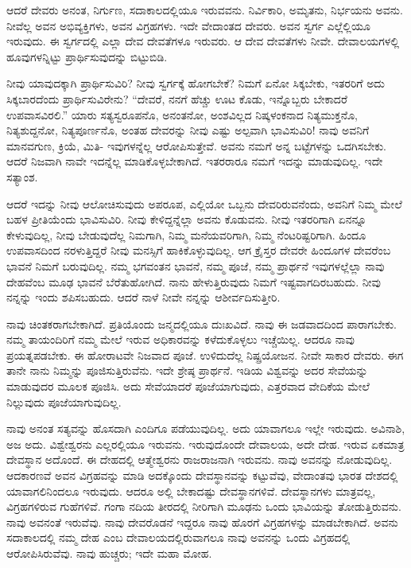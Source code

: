 ಆದರೆ ದೇವರು ಅನಂತ, ನಿರ್ಗುಣ, ಸದಾಕಾಲದಲ್ಲಿಯೂ ಇರುವವನು. ನಿರ್ವಿಕಾರಿ, ಅಮೃತನು, ನಿರ್ಭಯನು ಅವನು. ನೀವೆಲ್ಲ ಅವನ ಅಭಿವ್ಯಕ್ತಿಗಳು, ಅವನ ವಿಗ್ರಹಗಳು. ಇದೇ ವೇದಾಂತದ ದೇವರು. ಅವನ ಸ್ವರ್ಗ ಎಲ್ಲೆಲ್ಲಿಯೂ ಇರುವುದು. ಈ ಸ್ವರ್ಗದಲ್ಲಿ ಎಲ್ಲಾ ದೇವ ದೇವತೆಗಳೂ ಇರುವರು. ಆ ದೇವ ದೇವತೆಗಳು ನೀವೇ. ದೇವಾಲಯಗಳಲ್ಲಿ ಹೂವುಗಳನ್ನಿಟ್ಟು ಪ್ರಾರ್ಥಿಸುವುದನ್ನು ಬಿಟ್ಟುಬಿಡಿ.

ನೀವು ಯಾವುದಕ್ಕಾಗಿ ಪ್ರಾರ್ಥಿಸುವಿರಿ? ನೀವು ಸ್ವರ್ಗಕ್ಕೆ ಹೋಗಬೇಕೆ? ನಿಮಗೆ ಏನೋ ಸಿಕ್ಕಬೇಕು, ಇತರರಿಗೆ ಅದು ಸಿಕ್ಕಬಾರದೆಂದು ಪ್ರಾರ್ಥಿಸುವಿರೇನು? “ದೇವರೆ, ನನಗೆ ಹೆಚ್ಚು ಊಟ ಕೊಡು, ಇನ್ನೊಬ್ಬರು ಬೇಕಾದರೆ ಉಪವಾಸವಿರಲಿ.'' ಯಾರು ಸತ್ಯಸ್ವರೂಪನೊ, ಅನಂತನೋ, ಅಂಶವಿಲ್ಲದ ನಿಷ್ಕಳಂಕನಾದ ನಿತ್ಯಮುಕ್ತನೊ, ನಿತ್ಯಶುದ್ದನೋ, ನಿತ್ಯಪೂರ್ಣನೊ, ಅಂತಹ ದೇವರನ್ನು ನೀವು ಎಷ್ಟು ಅಲ್ಪವಾಗಿ ಭಾವಿಸುವಿರಿ! ನಾವು ಅವನಿಗೆ ಮಾನವಗುಣ, ಕ್ರಿಯೆ, ಮಿತಿ- ಇವುಗಳನ್ನೆಲ್ಲ ಆರೋಪಿಸುತ್ತೇವೆ. ಅವನು ನಮಗೆ ಅನ್ನ ಬಟ್ಟೆಗಳನ್ನು ಒದಗಿಸಬೇಕು. ಆದರೆ ನಿಜವಾಗಿ ನಾವೇ ಇದನ್ನೆಲ್ಲ ಮಾಡಿಕೊಳ್ಳಬೇಕಾಗಿದೆ. ಇತರರಾರೂ ನಮಗೆ ಇದನ್ನು ಮಾಡುವುದಿಲ್ಲ. ಇದೇ ಸತ್ಯಾಂಶ.

ಆದರೆ ಇದನ್ನು ನೀವು ಆಲೋಚಿಸುವುದು ಅಪರೂಪ, ಎಲ್ಲಿಯೋ ಒಬ್ಬನು ದೇವರಿರುವನೆಂದು, ಅವನಿಗೆ ನಿಮ್ಮ ಮೇಲೆ ಬಹಳ ಪ್ರೀತಿಯೆಂದು ಭಾವಿಸುವಿರಿ. ನೀವು ಕೇಳಿದ್ದನ್ನೆಲ್ಲಾ ಅವನು ಕೊಡುವನು. ನೀವು ಇತರರಿಗಾಗಿ ಏನನ್ನೂ ಕೇಳುವುದಿಲ್ಲ, ನೀವು ಬೇಡುವುದೆಲ್ಲ ನಿಮಗಾಗಿ, ನಿಮ್ಮ ಮನೆಯವರಿಗಾಗಿ, ನಿಮ್ಮ ನೆಂಟರಿಷ್ಟರಿಗಾಗಿ. ಹಿಂದೂ ಉಪವಾಸದಿಂದ ನರಳುತ್ತಿದ್ದರೆ ನೀವು ಮನಸ್ಸಿಗೆ ಹಾಕಿಕೊಳ್ಳುವುದಿಲ್ಲ. ಆಗ ಕ್ರೈಸ್ತರ ದೇವರೇ ಹಿಂದೂಗಳ ದೇವರೆಂಬ ಭಾವನೆ ನಿಮಗೆ ಬರುವುದಿಲ್ಲ. ನಮ್ಮ ಭಗವಂತನ ಭಾವನೆ, ನಮ್ಮ ಪೂಜೆ, ನಮ್ಮ ಪ್ರಾರ್ಥನೆ ಇವುಗಳಲ್ಲೆಲ್ಲಾ ನಾವು ದೇಹವೆಂಬ ಮೂಢ ಭಾವನೆ ಬೆರೆತುಹೋಗಿದೆ. ನಾನು ಹೇಳುತ್ತಿರುವುದು ನಿಮಗೆ ಇಷ್ಟವಾಗದಿರಬಹುದು. ನೀವು ನನ್ನನ್ನು ಇಂದು ಶಪಿಸಬಹುದು. ಆದರೆ ನಾಳೆ ನೀವೇ ನನ್ನನ್ನು ಆಶೀರ್ವದಿಸುತ್ತೀರಿ.

ನಾವು ಚಿಂತಕರಾಗಬೇಕಾಗಿದೆ. ಪ್ರತಿಯೊಂದು ಜನ್ಮದಲ್ಲಿಯೂ ದುಃಖವಿದೆ. ನಾವು ಈ ಜಡವಾದದಿಂದ ಪಾರಾಗಬೇಕು. ನಮ್ಮ ತಾಯಂದಿರಿಗೆ ನಮ್ಮ ಮೇಲೆ ಇರುವ ಅಧಿಕಾರವನ್ನು ಕಳೆದುಕೊಳ್ಳಲು ಇಚ್ಚೆಯಿಲ್ಲ. ಆದರೂ ನಾವು ಪ್ರಯತ್ನಪಡಬೇಕು. ಈ ಹೋರಾಟವೇ ನಿಜವಾದ ಪೂಜೆ. ಉಳಿದುದೆಲ್ಲ ನಿಷ್ಪ್ರಯೋಜನ. ನೀವೇ ಸಾಕಾರ ದೇವರು. ಈಗ ತಾನೇ ನಾನು ನಿಮ್ಮನ್ನು ಪೂಜಿಸುತ್ತಿರುವೆನು. ಇದೇ ಶ್ರೇಷ್ಠ ಪ್ರಾರ್ಥನೆ. ಇಡಿಯ ವಿಶ್ವವನ್ನು ಅದರ ಸೇವೆಯನ್ನು ಮಾಡುವುದರ ಮೂಲಕ ಪೂಜಿಸಿ. ಅದು ಸೇವೆಯಾದರೆ ಪೂಜೆಯಾಗುವುದು, ಎತ್ತರವಾದ ವೇದಿಕೆಯ ಮೇಲೆ ನಿಲ್ಲುವುದು ಪೂಜೆಯಾಗುವುದಿಲ್ಲ.

ನಾವು ಅನಂತ ಸತ್ಯವನ್ನು ಹೊಸದಾಗಿ ಎಂದಿಗೂ ಪಡೆಯುವುದಿಲ್ಲ. ಅದು ಯಾವಾಗಲೂ ಇಲ್ಲೇ ಇರುವುದು. ಅವಿನಾಶಿ, ಅಜ ಅದು. ವಿಶ್ವೇಶ್ವರನು ಎಲ್ಲರಲ್ಲಿಯೂ ಇರುವನು. ಇರುವುದೊಂದೇ ದೇವಾಲಯ, ಅದೇ ದೇಹ. ಇರುವ ಏಕಮಾತ್ರ ದೇವಸ್ಥಾನ ಅದೊಂದೆ. ಈ ದೇಹದಲ್ಲಿ ಆತ್ಮೇಶ್ವರನು ರಾಜರಾಜನಾಗಿ ಇರುವನು. ನಾವು ಅವನನ್ನು ನೋಡುವುದಿಲ್ಲ. ಆದಕಾರಣವೆ ಅವನ ವಿಗ್ರಹವನ್ನು ಮಾಡಿ ಅದಕ್ಕೊಂದು ದೇವಸ್ಥಾನವನ್ನು ಕಟ್ಟುವೆವು, ವೇದಾಂತವು ಭಾರತ ದೇಶದಲ್ಲಿ ಯಾವಾಗಲಿನಿಂದಲೂ ಇರುವುದು. ಆದರೂ ಅಲ್ಲಿ ಬೇಕಾದಷ್ಟು ದೇವಸ್ಥಾನಗಳಿವೆ. ದೇವಸ್ಥಾನಗಳು ಮಾತ್ರವಲ್ಲ, ವಿಗ್ರಹಗಳಿರುವ ಗುಹೆಗಳಿವೆ. ಗಂಗಾ ನದಿಯ ತೀರದಲ್ಲಿ ನೀರಿಗಾಗಿ ಮೂಢನು ಒಂದು ಭಾವಿಯನ್ನು ತೋಡುತ್ತಿರುವನು. ನಾವು ಅವನಂತೆ ಇರುವೆವು. ನಾವು ದೇವರೊಡನೆ ಇದ್ದರೂ ನಾವು ಹೊರಗೆ ವಿಗ್ರಹಗಳನ್ನು ಮಾಡಬೇಕಾಗಿದೆ. ಅವನು ಸದಾಕಾಲದಲ್ಲಿ ನಮ್ಮ ದೇಹ ಎಂಬ ದೇವಾಲಯದಲ್ಲಿರುವಾಗಲೂ ನಾವು ಅವನನ್ನು ಒಂದು ವಿಗ್ರಹದಲ್ಲಿ ಆರೋಪಿಸಿರುವೆವು. ನಾವು ಹುಚ್ಚರು; ಇದೇ ಮಹಾ ಮೋಹ.

